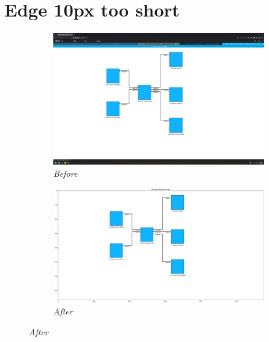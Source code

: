 \documentclass{article}
\begin{document}
\section{Edge 10px too short}
\begin{figure}[H]
    \centering
    \begin{subfigure}[t]{0.9\textwidth}
        \centering
        \includegraphics[width=\textwidth]{testcases/edge_10px_too_short/145039-079193_input_image.png}
        \caption*{\textit{Before}}
    \end{subfigure}
    \newline    
    \begin{subfigure}[t]{0.9\textwidth}
        \centering
        \includegraphics[width=\textwidth]{testcases/edge_10px_too_short/145058-578354_element_bbox_errors_labeled_colored.png}
        \caption*{\textit{After}}
    \end{subfigure}
    \label{fig:edge_too_short_10}
\end{figure}
\newpage
\end{document}
